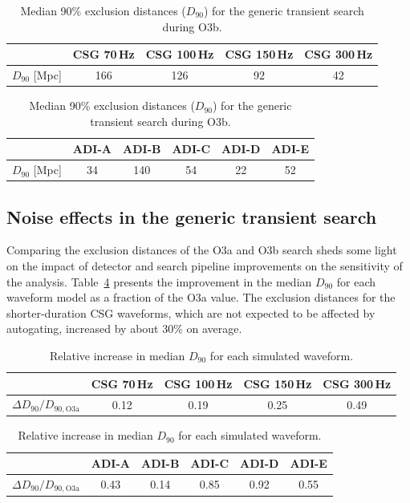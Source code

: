 \begin{table}[h]
  \hspace{0.5cm}
  \caption
  {\label{tab:grb-o3b-x-exclusion} Median 90\% exclusion distances ($D_{90}$) for the generic transient search during O3b.}
  \begin{tabular}{c c c c c}
    \hline
    \hline
    \rule{0pt}{4ex}
    & CSG 70\,Hz & CSG 100\,Hz & CSG 150\,Hz & CSG 300\,Hz \\
    \hline
    \rule[-2ex]{0pt}{4ex}
    $D_{90}$ [Mpc] & 166 & 126 & 92 & 42
  \end{tabular}
  \begin{tabular}{c c c c c c}
    \hline
    \hline
    \rule{0pt}{4ex}
    & ADI-A & ADI-B & ADI-C & ADI-D & ADI-E \\
    \hline
    \rule[-2ex]{0pt}{4ex}
    $D_{90}$ [Mpc] & 34 & 140 & 54 & 22 & 52 \\
    \hline
  \end{tabular}
\end{table}


\subsection{Noise effects in the generic transient search}\label{sec:grb-o3b-noise}

Comparing the exclusion distances of the O3a and O3b search sheds some light on the impact of detector and search pipeline improvements on the sensitivity of the \xpip analysis.
Table~\ref{tab:grb-o3b-compare-o3a} presents the improvement in the median $D_{90}$ for each waveform model as a fraction of the O3a value.
The exclusion distances for the shorter-duration CSG waveforms, which are not expected to be affected by autogating, increased by about 30\% on average.

\begin{table}[h]
  \hspace{0.5cm}
  \caption
  {\label{tab:grb-o3b-compare-o3a} Relative increase in median $D_{90}$ for each \xpip simulated waveform.}
  \begin{tabular}{c c c c c}
    \hline
    \hline
    \rule{0pt}{4ex}
    & CSG 70\,Hz & CSG 100\,Hz & CSG 150\,Hz & CSG 300\,Hz \\
    \hline
    \rule[-2ex]{0pt}{4ex}
		$\Delta D_{90} / D_{90, \text{O3a}}$ & 0.12 & 0.19 & 0.25 & 0.49
  \end{tabular}
  \begin{tabular}{c c c c c c}
    \hline
    \hline
    \rule{0pt}{4ex}
    & ADI-A & ADI-B & ADI-C & ADI-D & ADI-E \\
    \hline
    \rule[-2ex]{0pt}{4ex}
    $\Delta D_{90} / D_{90, \text{O3a}}$ & 0.43 & 0.14 & 0.85 & 0.92 & 0.55 \\
    \hline
  \end{tabular}
\end{table}


